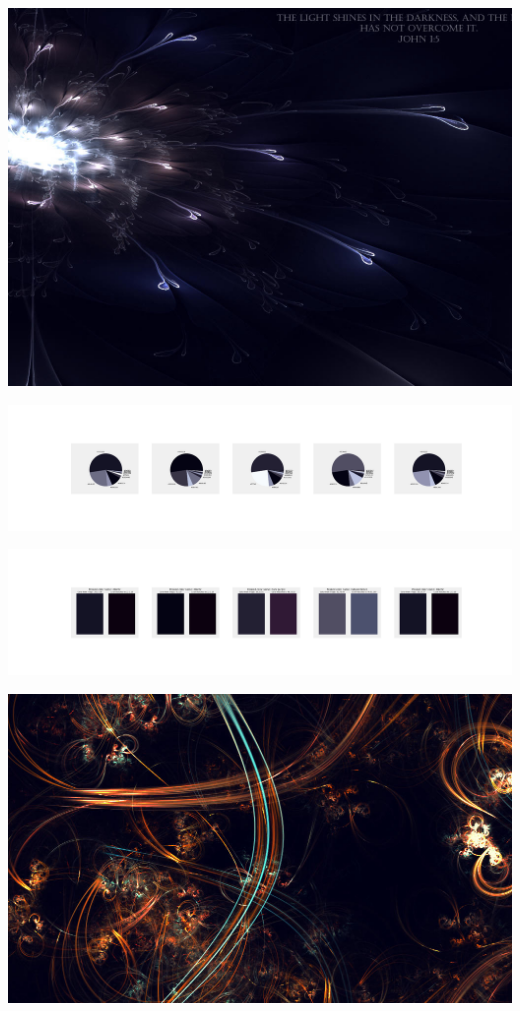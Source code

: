 \documentclass[11pt]{article}
\begin{document}
\begin{landscape}
    \begin{center}
    \includegraphics[width=\textwidth]{./nbimg/file (76).jpg}
    \end{center}

    \begin{center}
    \includegraphics[width=250mm]{./nbimg/pie-425.jpg}
    \end{center}

    \begin{center}
    \includegraphics[width=250mm]{./nbimg/peak-425.jpg}
    \end{center}
    

    \begin{center}
    \includegraphics[width=\textwidth]{./nbimg/file (77).jpg}
    \end{center}


\end{landscape}
\end{document}
